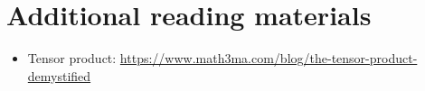 \section{Additional reading materials}
\begin{itemize}
    \item Tensor product: \url{https://www.math3ma.com/blog/the-tensor-product-demystified}
\end{itemize}
